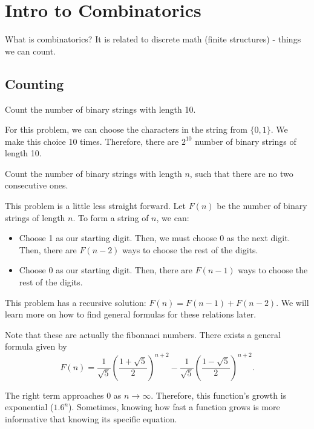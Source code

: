 
\section{Intro to Combinatorics}

What is combinatorics? It is related to discrete math (finite structures) - things we can count.

\subsection{Counting}
\begin{eg}
	Count the number of binary strings with length 10.
\end{eg}

For this problem, we can choose the characters in the string from \( \{0, 1\}   \). We make this choice 10 times. Therefore, there are \( 2^{10}  \) number of binary strings of length 10.

\begin{eg}
	Count the number of binary strings with length \( n \), such that there are no two consecutive ones. 
\end{eg}

This problem is a little less straight forward. Let \( F(n) \) be the number of binary strings of length \( n \). To form a string of \( n \), we can:
\begin{itemize}
	\item Choose 1 as our starting digit. Then, we must choose 0 as the next digit. Then, there are \( F(n-2) \) ways to choose the rest of the digits.
	\item Choose 0 as our starting digit. Then, there are \( F(n-1) \) ways to choose the rest of the digits.
\end{itemize}
This problem has a recursive solution: \( F(n) = F(n-1) + F(n-2) \). We will learn more on how to find general formulas for these relations later.

\begin{note}
	Note that these are actually the fibonnaci numbers. There exists a general formula given by \[
		F(n) = \frac{1}{\sqrt{5} }\left( \frac{1+\sqrt{5} }{2} \right)^{n+2} - \frac{1}{\sqrt{5} }\left( \frac{1-\sqrt{5} }{2} \right)^{n+2} 
	.\] 
\end{note}

\begin{remark}
The right term approaches 0 as \( n \to \infty \). Therefore, this function's growth is exponential (\( 1.6^n \)). Sometimes, knowing how fast a function grows is more informative that knowing its specific equation.
\end{remark}

